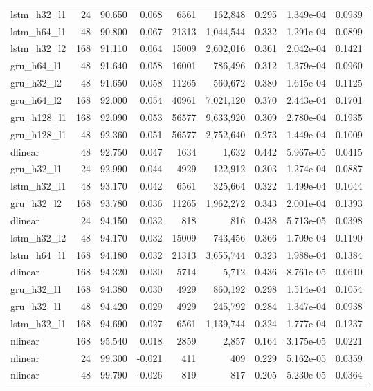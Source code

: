 \begin{table}[htbp]
\begin{tabular}{lrrrrrrrr}
lstm\_h32\_l1 & 24 & 90.650 & 0.068 & 6561 & 162,848 & 0.295 & 1.349e-04 & 0.0939 \\
lstm\_h64\_l1 & 48 & 90.800 & 0.067 & 21313 & 1,044,544 & 0.332 & 1.291e-04 & 0.0899 \\
lstm\_h32\_l2 & 168 & 91.110 & 0.064 & 15009 & 2,602,016 & 0.361 & 2.042e-04 & 0.1421 \\
gru\_h64\_l1 & 48 & 91.640 & 0.058 & 16001 & 786,496 & 0.312 & 1.379e-04 & 0.0960 \\
gru\_h32\_l2 & 48 & 91.650 & 0.058 & 11265 & 560,672 & 0.380 & 1.615e-04 & 0.1125 \\
gru\_h64\_l2 & 168 & 92.000 & 0.054 & 40961 & 7,021,120 & 0.370 & 2.443e-04 & 0.1701 \\
gru\_h128\_l1 & 168 & 92.090 & 0.053 & 56577 & 9,633,920 & 0.309 & 2.780e-04 & 0.1935 \\
gru\_h128\_l1 & 48 & 92.360 & 0.051 & 56577 & 2,752,640 & 0.273 & 1.449e-04 & 0.1009 \\
dlinear & 48 & 92.750 & 0.047 & 1634 & 1,632 & 0.442 & 5.967e-05 & 0.0415 \\
gru\_h32\_l1 & 24 & 92.990 & 0.044 & 4929 & 122,912 & 0.303 & 1.274e-04 & 0.0887 \\
lstm\_h32\_l1 & 48 & 93.170 & 0.042 & 6561 & 325,664 & 0.322 & 1.499e-04 & 0.1044 \\
gru\_h32\_l2 & 168 & 93.780 & 0.036 & 11265 & 1,962,272 & 0.343 & 2.001e-04 & 0.1393 \\
dlinear & 24 & 94.150 & 0.032 & 818 & 816 & 0.438 & 5.713e-05 & 0.0398 \\
lstm\_h32\_l2 & 48 & 94.170 & 0.032 & 15009 & 743,456 & 0.366 & 1.709e-04 & 0.1190 \\
lstm\_h64\_l1 & 168 & 94.180 & 0.032 & 21313 & 3,655,744 & 0.323 & 1.988e-04 & 0.1384 \\
dlinear & 168 & 94.320 & 0.030 & 5714 & 5,712 & 0.436 & 8.761e-05 & 0.0610 \\
gru\_h32\_l1 & 168 & 94.380 & 0.030 & 4929 & 860,192 & 0.298 & 1.514e-04 & 0.1054 \\
gru\_h32\_l1 & 48 & 94.420 & 0.029 & 4929 & 245,792 & 0.284 & 1.347e-04 & 0.0938 \\
lstm\_h32\_l1 & 168 & 94.690 & 0.027 & 6561 & 1,139,744 & 0.324 & 1.777e-04 & 0.1237 \\
nlinear & 168 & 95.540 & 0.018 & 2859 & 2,857 & 0.164 & 3.175e-05 & 0.0221 \\
nlinear & 24 & 99.300 & -0.021 & 411 & 409 & 0.229 & 5.162e-05 & 0.0359 \\
nlinear & 48 & 99.790 & -0.026 & 819 & 817 & 0.205 & 5.230e-05 & 0.0364 \\
\bottomrule
\end{tabular}
\end{table}
